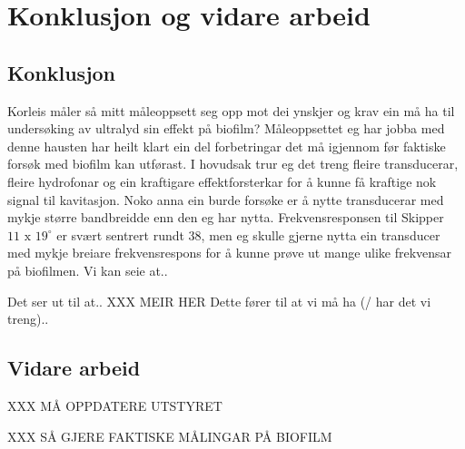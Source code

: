\section{Konklusjon og vidare arbeid}
\subsection{Konklusjon}
Korleis måler så mitt måleoppsett seg opp mot dei ynskjer og krav ein må ha til undersøking av ultralyd sin effekt på biofilm? Måleoppsettet eg har jobba med denne hausten har heilt klart ein del forbetringar det må igjennom før faktiske forsøk med biofilm kan utførast. I hovudsak trur eg det treng fleire transducerar, fleire hydrofonar og ein kraftigare effektforsterkar for å kunne få kraftige nok signal til kavitasjon. Noko anna ein burde forsøke er å nytte transducerar med mykje større bandbreidde enn den eg har nytta. Frekvensresponsen til Skipper $11\text{ x }19^\circ$ er svært sentrert rundt \unit{38}{\kilo\hertz}, men eg skulle gjerne nytta ein transducer med mykje breiare frekvensrespons for å kunne prøve ut mange ulike frekvensar på biofilmen.
Vi kan seie at..

Det ser ut til at..
XXX MEIR HER
Dette fører til at vi må ha (/ har det vi treng)..
 
\subsection{Vidare arbeid}
XXX MÅ OPPDATERE UTSTYRET

XXX SÅ GJERE FAKTISKE MÅLINGAR PÅ BIOFILM

